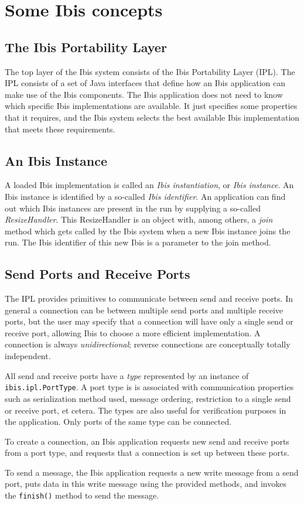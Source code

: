 \documentclass[10pt]{article}
\newcommand{\mysection}[1]{\section{#1}\label{#1}}
\newcommand{\mysubsection}[1]{\subsection{#1}\label{#1}}
\begin{document}
\mysection{Some Ibis concepts}

\mysubsection{The Ibis Portability Layer}

The top layer of the Ibis system consists of the Ibis Portability Layer (IPL).
The IPL consists of a set of Java interfaces that define how an Ibis application
can make use of the Ibis components.
The Ibis application does not need to know which specific Ibis implementations are
available.
It just specifies some properties that it requires, and the Ibis system
selects the best available Ibis implementation that meets these requirements.
 
\mysubsection{An Ibis Instance}

A loaded Ibis implementation is called an \emph{Ibis instantiation}, or 
\emph{Ibis instance}.
An Ibis instance is identified by a so-called
\emph{Ibis identifier}.
An application can find out which Ibis instances are present in the run
by supplying a so-called \emph{ResizeHandler}.
This ResizeHandler is an object with, among others, a \emph{join} method
which gets called by the Ibis system when a new Ibis instance joins the
run.
The Ibis identifier of this new Ibis is a parameter to the join method.

\mysubsection{Send Ports and Receive Ports}

The IPL provides primitives to communicate between send and receive ports.
In general a connection can be between multiple send ports and multiple
receive ports, but the user may specify that a connection will have only
a single send or receive port, allowing Ibis to choose a more efficient
implementation.  A connection is always \emph{unidirectional}; reverse
connections are conceptually totally independent.

All send and receive ports have a \emph{type} represented by an
instance of \texttt{ibis.ipl.PortType}. A port type is is associated
with communication properties such as serialization method used, message
ordering, restriction to a single send or receive port, et cetera. The
types are also useful for verification purposes in the application.
Only ports of the same type can be connected.

To create a connection, an Ibis application requests new send and receive
ports from a port type, and requests that a connection is set up 
between these ports.

To send a message, the Ibis application requests a new write message from
a send port, puts data in this write message using the provided methods,
and invokes the \texttt{finish()} method to send the message.
\end{document}
